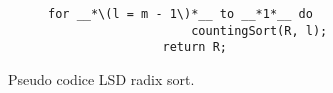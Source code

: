 \documentclass{subfiles}
\begin{document}
\begin{figure}[h!]
    \centering
    \begin{subfigure}[b]{.3\textwidth}
        \begin{lstlisting}[language = PSEUDO]
                for __*\(l = m - 1\)*__ to __*1*__ do 
                    countingSort(R, l);
                return R;
            \end{lstlisting}
    \end{subfigure}
    \caption{Pseudo codice LSD radix sort.}
    \label{Fig:6}
\end{figure}
\end{document}
